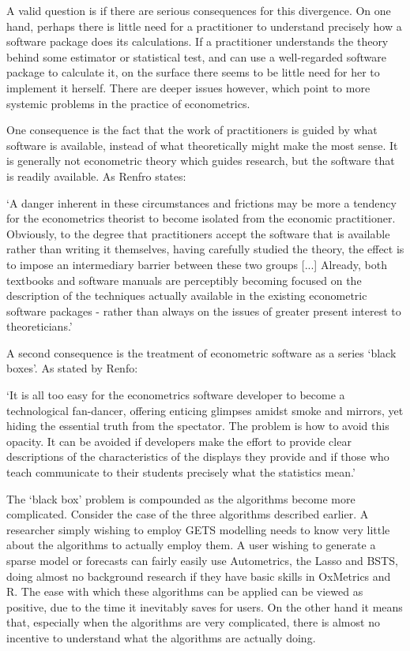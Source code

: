 A valid question is if there are serious consequences for this divergence. On one hand, perhaps there is little need for a practitioner to understand precisely how a software package does its calculations. If a practitioner understands the theory behind some estimator or statistical test, and can use a well-regarded software package to calculate it, on the surface there seems to be little need for her to implement it herself. There are deeper issues however, which point to more systemic problems in the practice of econometrics. 

One consequence is the fact that the work of practitioners is guided by what software is available, instead of what theoretically might make the most sense. It is generally not econometric theory which guides research, but the software that is readily available. As Renfro states:
\begin{displayquote}
`A danger inherent in these circumstances and frictions may be more a tendency for the econometrics theorist to become isolated from the economic practitioner. Obviously, to the degree that practitioners accept the software that is available rather than writing it themselves, having carefully studied the theory, the effect is to impose an intermediary barrier between these  two groups [...] Already, both textbooks and software manuals are perceptibly becoming focused on the description of the techniques actually available in the existing econometric software packages - rather than always on the issues of greater present interest to theoreticians.'
\end{displayquote}
A second consequence is the treatment of econometric software as a series `black boxes'. As stated by Renfo:
\begin{displayquote}
`It is all too easy for the econometrics software developer to become a technological fan-dancer, offering enticing glimpses amidst smoke and mirrors, yet hiding the essential truth from the spectator. The problem is how to avoid this opacity. It can be avoided if developers make the effort to provide clear descriptions of the characteristics of the displays they provide and if those who teach communicate to their students precisely what the statistics mean.'
\end{displayquote}
The `black box' problem is compounded as the algorithms become more complicated. Consider the case of the three algorithms described earlier. A researcher simply wishing to employ GETS modelling needs to know very little about the algorithms to actually employ them. A user wishing to generate a sparse model or forecasts can fairly easily use Autometrics, the Lasso and BSTS, doing almost no background research if they have basic skills in OxMetrics and R. The ease with which these algorithms can be applied can be viewed as positive, due to the time it inevitably saves for users. On the other hand it means that, especially when the algorithms are very complicated, there is almost no incentive to understand what the algorithms are actually doing.

